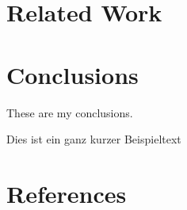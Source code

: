 \documentclass[pdftex,english,oribibl]{llncs}
\begin{document}
\section{Related Work}\label{sec:relatedWork}

\section{Conclusions}\label{sec:conclusions}

  These are my conclusions. \cite[12]{fitzgerald:realigning_research_and_practice} 

Dies ist ein ganz kurzer Beispieltext \cite{AspectJ2007}

\section{References}\label{sec:references}

\end{document}
